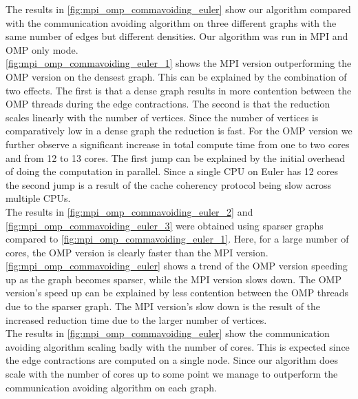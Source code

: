 The results in \autoref{fig:mpi_omp_commavoiding_euler} show our algorithm compared with the
communication avoiding algorithm \cite{comm_avoiding} on three different graphs with the same
number of edges but different densities. Our algorithm was run in MPI and OMP only mode.\\
\autoref{fig:mpi_omp_commavoiding_euler_1} shows the MPI version outperforming the OMP version
on the densest graph. This can be explained by the combination of two effects. The first is that a
dense graph results in more contention between the OMP threads during the
edge contractions. The second is that the reduction scales linearly with the number of vertices.
Since the number of vertices is comparatively low in a dense graph the
reduction is fast. For the OMP version we further observe a significant increase in total
compute time from one to two cores and from 12 to 13 cores. The first jump can be explained by the
initial overhead of doing the computation in parallel. Since a single CPU on Euler has 12 cores the
second jump is a result of  the cache coherency protocol being slow across multiple CPUs.\\
The results in \autoref{fig:mpi_omp_commavoiding_euler_2} and
\autoref{fig:mpi_omp_commavoiding_euler_3} were obtained using sparser graphs compared to
\autoref{fig:mpi_omp_commavoiding_euler_1}. Here, for a large number of cores, the OMP version
is clearly faster than the MPI version. \autoref{fig:mpi_omp_commavoiding_euler} shows a trend
of the OMP version speeding up as the graph becomes sparser, while the MPI version slows
down. The OMP version's speed up can be explained by less contention between the OMP
threads due to the sparser graph. The MPI version's slow down is the result of the increased
reduction time due to the larger number of vertices.\\
The results in \autoref{fig:mpi_omp_commavoiding_euler} show the communication avoiding algorithm
scaling badly with the number of cores. This is expected since the edge contractions are computed
on a single node. Since our algorithm does scale with the number of cores up
to some point we manage to outperform the communication avoiding algorithm on each graph.


%
%
%


